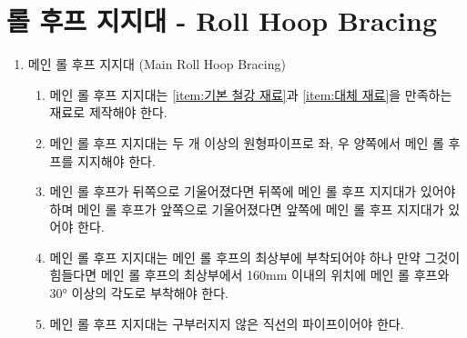 \documentclass[final,a4paper,10pt]{report}
\begin{document}
\section{롤 후프 지지대 - Roll Hoop Bracing}\label{rule:formula-technical.roll-hoop-bracing}
\begin{enumerate}
  \item\label{rule:formula-technical.roll-hoop-bracing.main-hoop-bracing} 메인 롤 후프 지지대 (Main Roll Hoop Bracing) \label{item:메인 롤 후프 지지대}
    \begin{enumerate}
      \item\label{rule:formula-technical.roll-hoop-bracing.main-hoop-bracing.material-compliance} 메인 롤 후프 지지대는 \ref{item:기본 철강 재료}과 \ref{item:대체 재료}을 만족하는 재료로 제작해야 한다.
      \item\label{rule:formula-technical.roll-hoop-bracing.main-hoop-bracing.min-2tubes-both-sides} 메인 롤 후프 지지대는 두 개 이상의 원형파이프로 좌, 우 양쪽에서 메인 롤 후프를 지지해야 한다.
      \item\label{rule:formula-technical.roll-hoop-bracing.main-hoop-bracing.bracing-matches-tilt-direction} 메인 롤 후프가 뒤쪽으로 기울어졌다면 뒤쪽에 메인 롤 후프 지지대가 있어야 하며 메인 롤 후프가 앞쪽으로 기울어졌다면 앞쪽에 메인 롤 후프 지지대가 있어야 한다.
      \item\label{rule:formula-technical.roll-hoop-bracing.main-hoop-bracing.attachment-point-160mm-30deg} 메인 롤 후프 지지대는 메인 롤 후프의 최상부에 부착되어야 하나 만약 그것이 힘들다면 메인 롤 후프의 최상부에서 160mm 이내의 위치에 메인 롤 후프와 30° 이상의 각도로 부착해야 한다.
      \item\label{rule:formula-technical.roll-hoop-bracing.main-hoop-bracing.straight-tube-only} 메인 롤 후프 지지대는 구부러지지 않은 직선의 파이프이어야 한다.
    \end{enumerate}


\end{enumerate}
\end{document}
